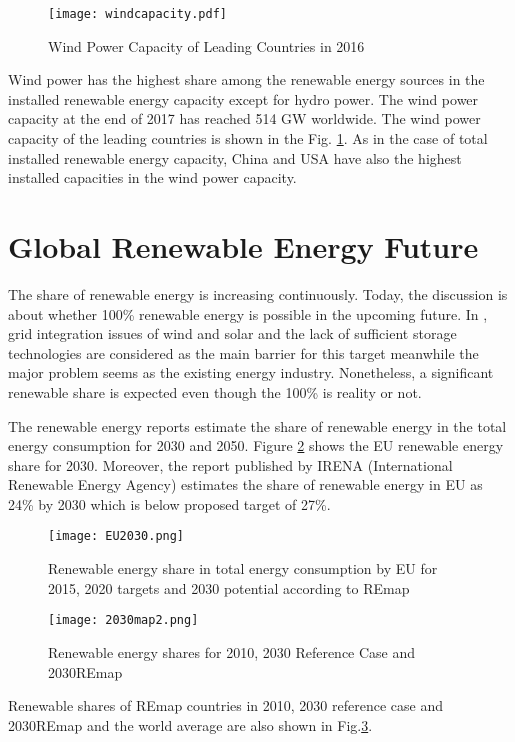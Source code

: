 \begin{figure}[h!]
	\centering
	\texttt{[image: windcapacity.pdf]}
	\caption{Wind Power Capacity of Leading Countries in 2016}
	\label{windcap}
\end{figure}
Wind power has the highest share among the renewable energy sources in the installed renewable energy capacity except for hydro power. The wind power capacity at the end of 2017 has reached 514 GW worldwide\cite{InternationalRenewableEnergyAgencyIRENA2018}. The wind power capacity of the leading countries is shown in the Fig. \ref{windcap}. As in the case of total installed renewable energy capacity, China and USA have also the highest installed capacities in the wind power capacity. \par
\section{Global Renewable Energy Future}
The share of renewable energy is increasing continuously. Today, the discussion is about whether 100\% renewable energy is possible in the upcoming future. In \cite{REN212017d}, grid integration issues of wind and solar and the lack of sufficient storage technologies are considered as the main barrier for this target meanwhile the major problem seems as the existing energy industry. Nonetheless, a significant renewable share is expected even though the 100\% is reality or not.\par
The renewable energy reports estimate the share of renewable energy in the total energy consumption for 2030 and 2050. Figure \ref{EU2030} shows the EU renewable energy share for 2030. Moreover, the report published by IRENA (International Renewable Energy Agency) estimates the share of renewable energy in EU as 24\% by 2030 which is below proposed target of 27\%\cite{IRENA2014}.\par
\begin{figure}[h!]
	\centering
	\texttt{[image: EU2030.png]}
	\caption{Renewable energy share in total energy consumption by EU for 2015, 2020 targets and 2030 potential according to REmap \cite{EuropeanCommission2018}}
	\label{EU2030}
\end{figure}
\begin{figure}[h!]
	\centering
	\texttt{[image: 2030map2.png]}
	\caption{Renewable energy shares for 2010, 2030 Reference Case and 2030REmap \cite{IRENA2014}}
	\label{2030map}
\end{figure}
Renewable shares of REmap countries in 2010, 2030 reference case and 2030REmap and the world average are also shown in Fig.\ref{2030map}. 
